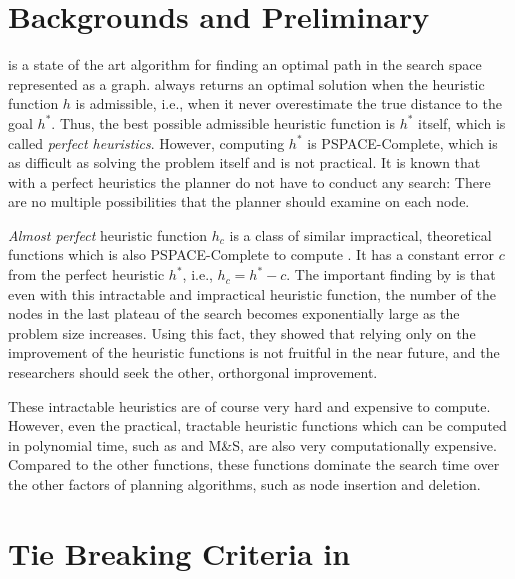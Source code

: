 \section{Backgrounds and Preliminary}
\label{sec-1}


\astar is a state of the art algorithm for finding an optimal path in the
search space represented as a graph. 
\astar always returns an optimal solution when the heuristic function $h$ is
admissible, i.e., when it never overestimate the true distance to the goal
$h^*$.
% 
Thus, the best possible admissible heuristic function is $h^*$ itself, which is
called \emph{perfect heuristics}. However, computing $h^*$ is PSPACE-Complete,
which is as difficult as solving the problem itself and is not
practical. It is known that with a perfect heuristics the planner do not have to conduct any search: There are no multiple possibilities that the planner should examine on each node.

\emph{Almost perfect} heuristic function $h_c$ is a class of similar
impractical, theoretical functions which is also PSPACE-Complete to compute \cite{helmert2008good}.
It has a constant error $c$ from the perfect heuristic $h^*$, i.e., $h_c=h^*-c$.
The important finding by \citeauthor{helmert2008good} is that even with this intractable and impractical heuristic function, the number of the nodes in the last plateau of the search becomes exponentially large as the problem size increases.
Using this fact, they showed that relying only on the improvement of the heuristic functions is not fruitful in the near future, and the researchers should seek the other, orthorgonal improvement.

These intractable heuristics are of course very hard and expensive to compute. However, even the practical, tractable heuristic functions which can be computed in polynomial time, such as \lmcut and M\&S, are also very computationally expensive. Compared to the other functions, these functions dominate the search time over the other factors of planning algorithms, such as node insertion and deletion.

\section{Tie Breaking Criteria in \astar}


